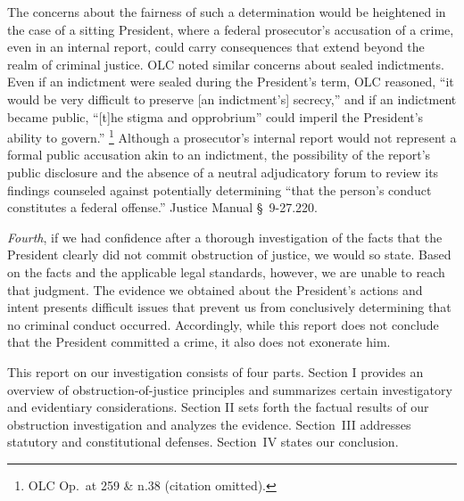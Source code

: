 The concerns about the fairness of such a determination would be heightened in the case of a sitting President, where a federal prosecutor's accusation of a crime, even in an internal report, could carry consequences that extend beyond the realm of criminal justice.
OLC noted similar concerns about sealed indictments.
Even if an indictment were sealed during the President's term, OLC reasoned, ``it would be very difficult to preserve [an indictment's] secrecy,'' and if an indictment became public, ``[t]he stigma and opprobrium'' could imperil the President's ability to govern.''%
\footnote{OLC Op.\ at 259 \& n.38 (citation omitted).}
Although a prosecutor's internal report would not represent a formal public accusation akin to an indictment, the possibility of the report's public disclosure and the absence of a neutral adjudicatory forum to review its findings counseled against potentially determining ``that the person's conduct constitutes a federal offense.''
Justice Manual \S~9-27.220.

\textit{Fourth}, if we had confidence after a thorough investigation of the facts that the President clearly did not commit obstruction of justice, we would so state.
Based on the facts and the applicable legal standards, however, we are unable to reach that judgment.
The evidence we obtained about the President's actions and intent presents difficult issues that prevent us from
conclusively determining that no criminal conduct occurred.
Accordingly, while this report does not conclude that the President committed a crime, it also does not exonerate him.

\hr

This report on our investigation consists of four parts.
Section I provides an overview of obstruction-of-justice principles and summarizes certain investigatory and evidentiary considerations.
Section II sets forth the factual results of our obstruction investigation and analyzes the evidence.
Section~III addresses statutory and constitutional defenses.
Section~IV states our conclusion.
